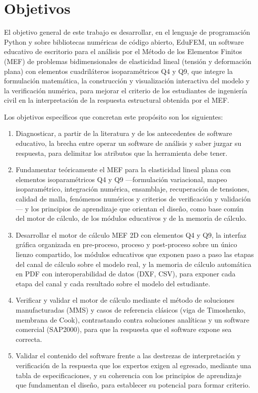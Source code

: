 \section*{Objetivos}

El objetivo general de este trabajo es desarrollar, en el lenguaje de programación Python y sobre bibliotecas numéricas de código abierto, EduFEM, un software educativo de escritorio para el análisis por el Método de los Elementos Finitos (MEF) de problemas bidimensionales de elasticidad lineal (tensión y deformación plana) con elementos cuadriláteros isoparamétricos Q4 y Q9, que integre la formulación matemática, la construcción y visualización interactiva del modelo y la verificación numérica, para mejorar el criterio de los estudiantes de ingeniería civil en la interpretación de la respuesta estructural obtenida por el MEF.

Los objetivos específicos que concretan este propósito son los siguientes:

\begin{enumerate}
    \item Diagnosticar, a partir de la literatura y de los antecedentes de software educativo, la brecha entre operar un software de análisis y saber juzgar su respuesta, para delimitar los atributos que la herramienta debe tener.
    \item Fundamentar teóricamente el MEF para la elasticidad lineal plana con elementos isoparamétricos Q4 y Q9 —formulación variacional, mapeo isoparamétrico, integración numérica, ensamblaje, recuperación de tensiones, calidad de malla, fenómenos numéricos y criterios de verificación y validación— y los principios de aprendizaje que orientan el diseño, como base común del motor de cálculo, de los módulos educativos y de la memoria de cálculo.
    \item Desarrollar el motor de cálculo MEF 2D con elementos Q4 y Q9, la interfaz gráfica organizada en pre-proceso, proceso y post-proceso sobre un único lienzo compartido, los módulos educativos que exponen paso a paso las etapas del canal de cálculo sobre el modelo real, y la memoria de cálculo automática en PDF con interoperabilidad de datos (DXF, CSV), para exponer cada etapa del canal y cada resultado sobre el modelo del estudiante.
    \item Verificar y validar el motor de cálculo mediante el método de soluciones manufacturadas (MMS) y casos de referencia clásicos (viga de Timoshenko, membrana de Cook), contrastando contra soluciones analíticas y un software comercial (SAP2000), para que la respuesta que el software expone sea correcta.
    \item Validar el contenido del software frente a las destrezas de interpretación y verificación de la respuesta que los expertos exigen al egresado, mediante una tabla de especificaciones, y su coherencia con los principios de aprendizaje que fundamentan el diseño, para establecer su potencial para formar criterio.
\end{enumerate}

